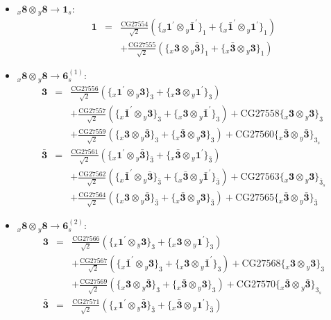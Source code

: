 \documentclass[english]{article}
\newcommand{\rep}[1]{\mathbf{#1}}
\newcommand{\repx}[2]{{}_{#2}\mathbf{#1}}
\newcommand{\subcg}[3]{\big\{ \repx{#1}{x}\otimes\repx{#2}{y}\big\}^{}_{#3}}
\begin{document}
\begin{itemize}
\item $\repx{8}{x}\otimes\repx{8}{y}\to\rep{1}_{s}$:
\begin{eqnarray*}
\rep{1} &=& \frac{\text{CG27554}}{\sqrt{2}}\left(\subcg{1^{\prime}}{\bar{1}^{\prime}}{1}+\subcg{\bar{1}^{\prime}}{1^{\prime}}{1}\right) \\ 
 & & +\frac{\text{CG27555}}{\sqrt{2}}\left(\subcg{3}{\bar{3}}{1}+\subcg{\bar{3}}{3}{1}\right)
\end{eqnarray*}
\item $\repx{8}{x}\otimes\repx{8}{y}\to\rep{6}_{s}^{(1)}$:
\begin{eqnarray*}
\rep{3} &=& \frac{\text{CG27556}}{\sqrt{2}}\left(\subcg{1^{\prime}}{3}{3}+\subcg{3}{1^{\prime}}{3}\right) \\ 
 & & +\frac{\text{CG27557}}{\sqrt{2}}\left(\subcg{\bar{1}^{\prime}}{3}{3}+\subcg{3}{\bar{1}^{\prime}}{3}\right)+\text{CG27558}\subcg{3}{3}{3} \\ 
 & & +\frac{\text{CG27559}}{\sqrt{2}}\left(\subcg{3}{\bar{3}}{3}+\subcg{\bar{3}}{3}{3}\right)+\text{CG27560}\subcg{\bar{3}}{\bar{3}}{3_{s}}
\\
\rep{\bar{3}} &=& \frac{\text{CG27561}}{\sqrt{2}}\left(\subcg{1^{\prime}}{\bar{3}}{\bar{3}}+\subcg{\bar{3}}{1^{\prime}}{\bar{3}}\right) \\ 
 & & +\frac{\text{CG27562}}{\sqrt{2}}\left(\subcg{\bar{1}^{\prime}}{\bar{3}}{\bar{3}}+\subcg{\bar{3}}{\bar{1}^{\prime}}{\bar{3}}\right)+\text{CG27563}\subcg{3}{3}{\bar{3}_{s}} \\ 
 & & +\frac{\text{CG27564}}{\sqrt{2}}\left(\subcg{3}{\bar{3}}{\bar{3}}+\subcg{\bar{3}}{3}{\bar{3}}\right)+\text{CG27565}\subcg{\bar{3}}{\bar{3}}{\bar{3}}
\end{eqnarray*}
\item $\repx{8}{x}\otimes\repx{8}{y}\to\rep{6}_{s}^{(2)}$:
\begin{eqnarray*}
\rep{3} &=& \frac{\text{CG27566}}{\sqrt{2}}\left(\subcg{1^{\prime}}{3}{3}+\subcg{3}{1^{\prime}}{3}\right) \\ 
 & & +\frac{\text{CG27567}}{\sqrt{2}}\left(\subcg{\bar{1}^{\prime}}{3}{3}+\subcg{3}{\bar{1}^{\prime}}{3}\right)+\text{CG27568}\subcg{3}{3}{3} \\ 
 & & +\frac{\text{CG27569}}{\sqrt{2}}\left(\subcg{3}{\bar{3}}{3}+\subcg{\bar{3}}{3}{3}\right)+\text{CG27570}\subcg{\bar{3}}{\bar{3}}{3_{s}}
\\
\rep{\bar{3}} &=& \frac{\text{CG27571}}{\sqrt{2}}\left(\subcg{1^{\prime}}{\bar{3}}{\bar{3}}+\subcg{\bar{3}}{1^{\prime}}{\bar{3}}\right) \\ 

\end{eqnarray*}
\end{itemize}
\end{document}
